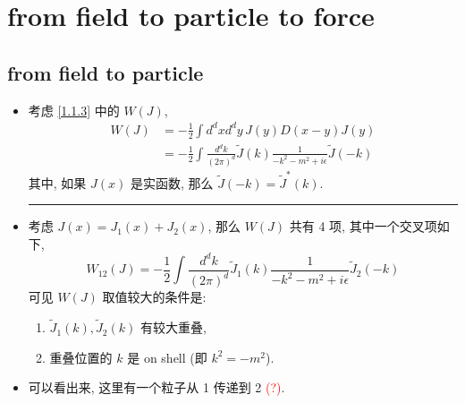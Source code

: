 \chapter{from field to particle to force}
\section{from field to particle}
\begin{itemize}
	\item 考虑 \eqref{1.1.3} 中的 $W(J)$,
	\begin{align}
		W(J) &= - \frac{1}{2} \int d^d x d^d y \, J(y) D(x - y) J(y) \\
		&= - \frac{1}{2} \int \frac{d^d k}{(2 \pi)^d} \tilde{J}(k) \frac{1}{- k^2 - m^2 + i \epsilon} \tilde{J}(- k)
	\end{align}
	其中, 如果 $J(x)$ 是实函数, 那么 $\tilde{J}(- k) = \tilde{J}^*(k)$.
	
	\noindent\rule[0.5ex]{\linewidth}{0.5pt} %
	
	\item 考虑 $J(x) = J_1(x) + J_2(x)$, 那么 $W(J)$ 共有 4 项, 其中一个交叉项如下,
	\begin{equation}
		W_{1 2}(J) = - \frac{1}{2} \int \frac{d^d k}{(2 \pi)^d} \tilde{J}_1(k) \frac{1}{- k^2 - m^2 + i \epsilon} \tilde{J}_2(- k)
	\end{equation}
	可见 $W(J)$ 取值较大的条件是:
	\begin{enumerate}
		\item $\tilde{J}_1(k), \tilde{J}_2(k)$ 有较大重叠,
		
		\item 重叠位置的 $k$ 是 on shell (即 $k^2 = - m^2$).
	\end{enumerate}
	
	\item 可以看出来, 这里有一个粒子从 1 传递到 2 \textcolor{red}{(?)}.
\end{itemize}

